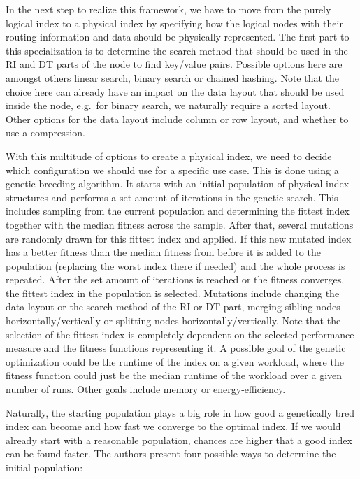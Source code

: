 In the next step to realize this framework, we have to move from the purely logical index to a physical index by specifying how the logical nodes with their routing information and data should be physically represented. The first part to this specialization is to determine the search method that should be used in the RI and DT parts of the node to find key/value pairs. Possible options here are amongst others linear search, binary search or chained hashing. Note that the choice here can already have an impact on the data layout that should be used inside the node, e.g.~for binary search, we naturally require a sorted layout. Other options for the data layout include column or row layout, and whether to use a compression.

With this multitude of options to create a physical index, we need to decide which configuration we should use for a specific use case. This is done using a genetic breeding algorithm. It starts with an initial population of physical index structures and performs a set amount of iterations in the genetic search. This includes sampling from the current population and determining the fittest index together with the median fitness across the sample. After that, several mutations are randomly drawn for this fittest index and applied. If this new mutated index has a better fitness than the median fitness from before it is added to the population (replacing the worst index there if needed) and the whole process is repeated. After the set amount of iterations is reached or the fitness converges, the fittest index in the population is selected. Mutations include changing the data layout or the search method of the RI or DT part, merging sibling nodes horizontally/vertically or splitting nodes horizontally/vertically. Note that the selection of the fittest index is completely dependent on the selected performance measure and the fitness functions representing it. A possible goal of the genetic optimization could be the runtime of the index on a given workload, where the fitness function could just be the median runtime of the workload over a given number of runs. Other goals include memory or energy-efficiency.

Naturally, the starting population plays a big role in how good a genetically bred index can become and how fast we converge to the optimal index. If we would already start with a reasonable population, chances are higher that a good index can be found faster. The authors present four possible ways to determine the initial population:

